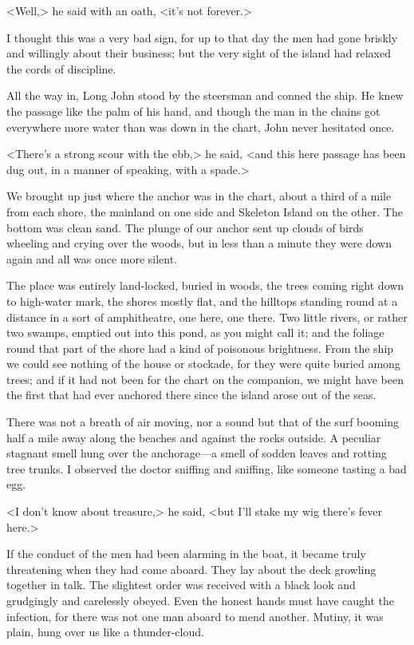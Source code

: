 <Well,> he said with an oath, <it's not forever.>

I thought this was a very bad sign, for up to that day the men had gone briskly and willingly about their business; but the very sight of the island had relaxed the cords of discipline.

All the way in, Long John stood by the steersman and conned the ship. He knew the passage like the palm of his hand, and though the man in the chains got everywhere more water than was down in the chart, John never hesitated once.

<There's a strong scour with the ebb,> he said, <and this here passage has been dug out, in a manner of speaking, with a spade.>

We brought up just where the anchor was in the chart, about a third of a mile from each shore, the mainland on one side and Skeleton Island on the other. The bottom was clean sand. The plunge of our anchor sent up clouds of birds wheeling and crying over the woods, but in less than a minute they were down again and all was once more silent.

The place was entirely land-locked, buried in woods, the trees coming right down to high-water mark, the shores mostly flat, and the hilltops standing round at a distance in a sort of amphitheatre, one here, one there. Two little rivers, or rather two swamps, emptied out into this pond, as you might call it; and the foliage round that part of the shore had a kind of poisonous brightness. From the ship we could see nothing of the house or stockade, for they were quite buried among trees; and if it had not been for the chart on the companion, we might have been the first that had ever anchored there since the island arose out of the seas.

There was not a breath of air moving, nor a sound but that of the surf booming half a mile away along the beaches and against the rocks outside. A peculiar stagnant smell hung over the an\-chor\-age—a smell of sodden leaves and rotting tree trunks. I observed the doctor sniffing and sniffing, like someone tasting a bad egg.

<I don't know about treasure,> he said, <but I'll stake my wig there's fever here.>

If the conduct of the men had been alarming in the boat, it became truly threatening when they had come aboard. They lay about the deck growling together in talk. The slightest order was received with a black look and grudgingly and carelessly obeyed. Even the honest hands must have caught the infection, for there was not one man aboard to mend another. Mutiny, it was plain, hung over us like a thunder-cloud.


